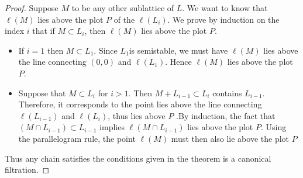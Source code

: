 \begin{proof}
Suppose $M$ to be any other sublattice of $L$. We want to know that $\ell(M)$ lies 
above the plot $P$ of the $\ell(L_i)$. We prove by induction on the index $i$ that if $M \subset L_i$, then $\ell(M)$ lies above the 
plot $P$. 
\begin{itemize}
    \item If $i=1$ then $M\subset L_1$. Since $L_1 $is semistable, we must have $\ell(M)$ lies above the line connecting $(0,0)$ and $\ell(L_1)$. Hence $\ell(M)$ lies above the plot $P$.
    \item Suppose that $M\subset L_i$ for $i>1$. Then $M+L_{i-1} \subset L_i$ contains $L_{i-1}$. Therefore, it corresponds to the point lies above the line connecting $\ell(L_{i-1})$ and $\ell(L_i)$, thus lies above $P$
    .By induction, the fact that $(M\cap L_{i-1}) \subset L_{i-1}$ implies $\ell(M\cap L_{i-1})$ lies above the plot $P$. 
    Using the parallelogram rule, the point $\ell(M)$ must then also lie above the plot $P$
\end{itemize}
Thus any chain satisfies the conditions given in the theorem is a canonical filtration.
\end{proof}
